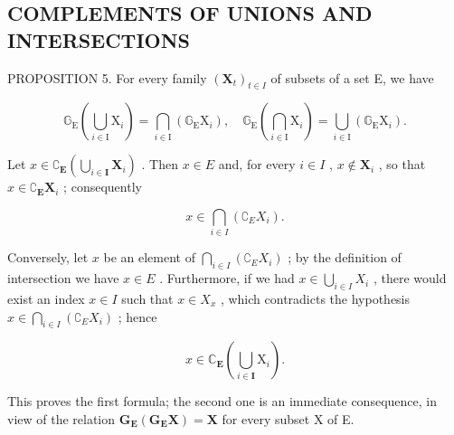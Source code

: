 \subsection{COMPLEMENTS OF UNIONS AND INTERSECTIONS}

PROPOSITION 5. For every family \((\mathbf{X}_t)_{t\in I}\) of subsets of a set E, we have

\[
\mathbb {G} _ {\mathrm{E}} \left(\bigcup_ {i \in \mathrm{I}} \mathrm{X} _ {i}\right) = \bigcap_ {i \in \mathrm{I}} \left(\mathbb {G} _ {\mathrm{E}} \mathrm{X} _ {i}\right), \quad \mathbb {G} _ {\mathrm{E}} \left(\bigcap_ {i \in \mathrm{I}} \mathrm{X} _ {i}\right) = \bigcup_ {i \in \mathrm{I}} \left(\mathbb {G} _ {\mathrm{E}} \mathrm{X} _ {i}\right).
\]

Let \(x \in \complement_{\mathbf{E}} \left( \bigcup_{i \in \mathbf{I}} \mathbf{X}_i \right)\) . Then \(x \in E\) and, for every \(i \in I\) , \(x \notin \mathbf{X}_i\) , so that \(x \in \complement_{\mathbf{E}} \mathbf{X}_i\) ; consequently

\[
x \in \bigcap_ {i \in I} \left(\complement_ {E} X _ {i}\right).
\]

Conversely, let \(x\) be an element of \(\bigcap_{i \in I} (\complement_E X_i)\) ; by the definition of intersection we have \(x \in E\) . Furthermore, if we had \(x \in \bigcup_{i \in I} X_i\) , there would exist an index \(x \in I\) such that \(x \in X_x\) , which contradicts the hypothesis \(x \in \bigcap_{i \in I} (\complement_E X_i)\) ; hence

\[
x \in \mathbb {C} _ {\mathbf {E}} \left(\bigcup_ {i \in \mathbf {I}} \mathrm{X} _ {i}\right).
\]

This proves the first formula; the second one is an immediate consequence, in view of the relation \(\mathbf{G}_{\mathbf{E}}(\mathbf{G}_{\mathbf{E}}\mathbf{X})=\mathbf{X}\) for every subset X of E.


